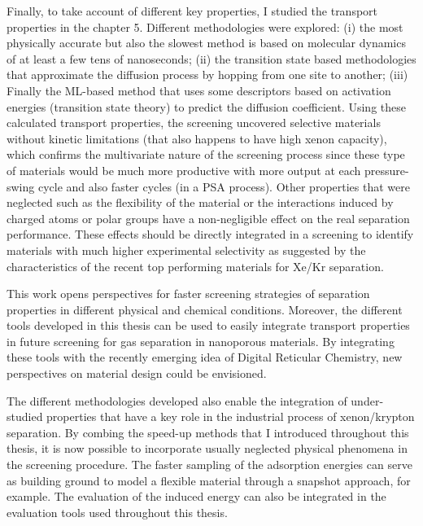 Finally, to take account of different key properties, I studied the transport properties in the chapter 5. Different methodologies were explored: (i) the most physically accurate but also the slowest method is based on molecular dynamics of at least a few tens of nanoseconds; (ii) the transition state based methodologies that approximate the diffusion process by hopping from one site to another; (iii) Finally the ML-based method that uses some descriptors based on activation energies (transition state theory) to predict the diffusion coefficient. Using these calculated transport properties, the screening uncovered selective materials without kinetic limitations (that also happens to have high xenon capacity), which confirms the multivariate nature of the screening process since these type of materials would be much more productive with more output at each pressure-swing cycle and also faster cycles (in a PSA process). Other properties that were neglected such as the flexibility of the material or the interactions induced by charged atoms or polar groups have a non-negligible effect on the real separation performance. These effects should be directly integrated in a screening to identify materials with much higher experimental selectivity as suggested by the characteristics of the recent top performing materials for Xe/Kr separation.\autocite{Li_2019,Pei_2022} 

 
\begin{center}
\end{center}


This work opens perspectives for faster screening strategies of separation properties in different physical and chemical conditions. Moreover, the different tools developed in this thesis can be used to easily integrate transport properties in future screening for gas separation in nanoporous materials. By integrating these tools with the recently emerging idea of Digital Reticular Chemistry,\autocite{Lyu_2020} new perspectives on material design could be envisioned. 

The different methodologies developed also enable the integration of under-studied properties that have a key role in the industrial process of xenon/krypton separation. By combing the speed-up methods that I introduced throughout this thesis, it is now possible to incorporate usually neglected physical phenomena in the screening procedure. The faster sampling of the adsorption energies can serve as building ground to model a flexible material through a snapshot approach, for example\autocite{Witman_2017}. The evaluation of the induced energy\autocite{Lachet_1998} can also be integrated in the evaluation tools used throughout this thesis. 



\vfill
\begin{center}
\end{center}
\vfill\vfill
